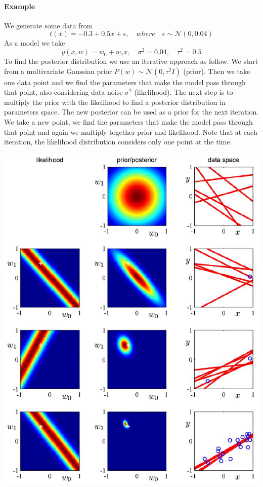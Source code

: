 \documentclass[main.tex]{subfiles}
\begin{document}
\paragraph{Example} 
We generate some data from 
\begin{equation*}
    t(x) = -0.3 + 0.5x + \epsilon, \quad where \quad \epsilon \sim \mathcal{N}(0,0.04)
\end{equation*}
As a model we take
\begin{equation*}
    y(x,w) = w_0+w_1x, \quad \sigma^2=0.04, \quad \tau^2=0.5
\end{equation*}
To find the posterior distribution we use an iterative approach as follow.
We start from a multivariate Gaussian prior $P(w) \sim \mathcal{N}(0,\tau^2 I)$ (prior). Then we take one data point and we find the parameters that make the model pass through that point, also considering data noise $\sigma^2$ (likelihood). The next step is to multiply the prior with the likelihood to find a posterior distribution in parameters space. The new posterior can be used as a prior for the next iteration. We take a new point, we find the parameters that make the model pass through that point and again we multiply together prior and likelihood. Note that at each iteration, the likelihood distribution considers only one point at the time.
\begin{center}
    \includegraphics[scale=0.6]{img/Bayes_sequential.PNG}
\end{center}
\end{document}
